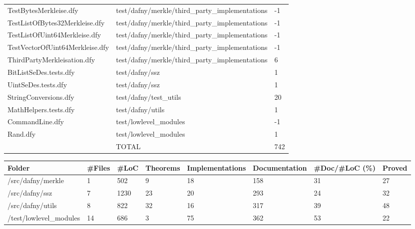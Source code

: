 \documentclass[a4paper, 12pt]{article}
\begin{document}
\begin{tabular}{lll}
          TestBytesMerkleise.dfy &  test/dafny/merkle/third\_party\_implementations &     -1 \\
  TestListOfBytes32Merkleise.dfy &  test/dafny/merkle/third\_party\_implementations &     -1 \\
   TestListOfUint64Merkleise.dfy &  test/dafny/merkle/third\_party\_implementations &     -1 \\
 TestVectorOfUint64Merkleise.dfy &  test/dafny/merkle/third\_party\_implementations &     -1 \\
     ThirdPartyMerkleisation.dfy &  test/dafny/merkle/third\_party\_implementations &      6 \\
          BitListSeDes.tests.dfy &                                 test/dafny/ssz &      1 \\
             UintSeDes.tests.dfy &                                 test/dafny/ssz &      1 \\
           StringConversions.dfy &                          test/dafny/test\_utils &     20 \\
           MathHelpers.tests.dfy &                               test/dafny/utils &      1 \\
                 CommandLine.dfy &                          test/lowlevel\_modules &     -1 \\
                        Rand.dfy &                          test/lowlevel\_modules &      1 \\
                                 &                                          TOTAL &    742 \\
\bottomrule
\end{tabular}

\vspace{2em}
\begin{tabular}{llllllll}
\toprule
                 Folder & \#Files &  \#LoC & Theorems & Implementations & Documentation & \#Doc/\#LoC (\%) & Proved \\
\midrule
      /src/dafny/merkle &      1 &   502 &        9 &              18 &           158 &            31 &     27 \\
         /src/dafny/ssz &      7 &  1230 &       23 &              20 &           293 &            24 &     32 \\
       /src/dafny/utils &      8 &   822 &       32 &              16 &           317 &            39 &     48 \\
 /test/lowlevel\_modules &     14 &   686 &        3 &              75 &           362 &            53 &     22 \\
\bottomrule
\end{tabular}
\end{document}
